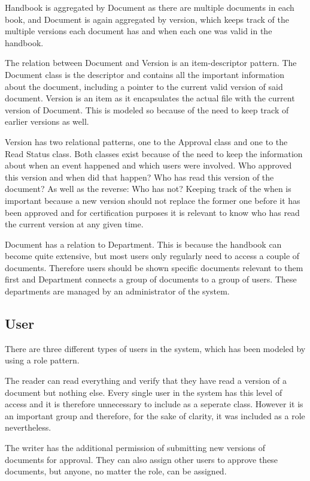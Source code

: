 Handbook is aggregated by Document as there are multiple documents in each book, and Document is again aggregated by version, which keeps track of the multiple versions each document has and when each one was valid in the handbook. 

The relation between Document and Version is an item-descriptor pattern. 
The Document class is the descriptor and contains all the important information about the document, including a pointer to the current valid version of said document. 
Version is an item as it encapsulates the actual file with the current version of Document. 
This is modeled so because of the need to keep track of earlier versions as well.

Version has two relational patterns, one to the Approval class and one to the Read Status class.
Both classes exist because of the need to keep the information about when an event happened and which users were involved. 
Who approved this version and when did that happen? 
Who has read this version of the document? 
As well as the reverse: Who has not?
Keeping track of the when is important because a new version should not replace the former one before it has been approved and for certification purposes it is relevant to know who has read the current version at any given time.

Document has a relation to Department. 
This is because the handbook can become quite extensive, but most users only regularly need to access a couple of documents. 
Therefore users should be shown specific documents relevant to them first and Department connects a group of documents to a group of users. 
These departments are managed by an administrator of the system.

\subsection{User}
There are three different types of users in the system, which has been modeled by using a role pattern. 

The reader can read everything and verify that they have read a version of a document but nothing else. 
Every single user in the system has this level of access and it is therefore unnecessary to include as a seperate class. 
However it is an important group and therefore, for the sake of clarity, it was included as a role nevertheless. 

The writer has the additional permission of submitting new versions of documents for approval. They can also assign other users to approve these documents, but anyone, no matter the role, can be assigned.

